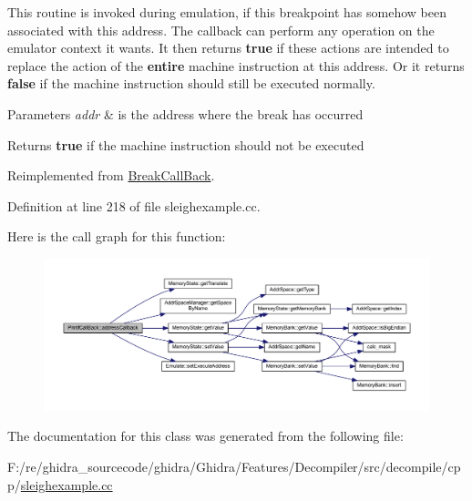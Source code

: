 This routine is invoked during emulation, if this breakpoint has somehow been associated with this address. The callback can perform any operation on the emulator context it wants. It then returns {\bfseries{true}} if these actions are intended to replace the action of the {\bfseries{entire}} machine instruction at this address. Or it returns {\bfseries{false}} if the machine instruction should still be executed normally. 
\begin{DoxyParams}{Parameters}
{\em addr} & is the address where the break has occurred \\
\hline
\end{DoxyParams}
\begin{DoxyReturn}{Returns}
{\bfseries{true}} if the machine instruction should not be executed 
\end{DoxyReturn}


Reimplemented from \mbox{\hyperlink{class_break_call_back_adb97ba6b111cb9a84856c9e0f9d506f9}{Break\+Call\+Back}}.



Definition at line 218 of file sleighexample.\+cc.

Here is the call graph for this function\+:
\nopagebreak
\begin{figure}[H]
\begin{center}
\leavevmode
\includegraphics[width=350pt]{class_printf_call_back_a9ff8d8997e91d769c03a4e09ad8373b5_cgraph}
\end{center}
\end{figure}


The documentation for this class was generated from the following file\+:\begin{DoxyCompactItemize}
\item 
F\+:/re/ghidra\+\_\+sourcecode/ghidra/\+Ghidra/\+Features/\+Decompiler/src/decompile/cpp/\mbox{\hyperlink{sleighexample_8cc}{sleighexample.\+cc}}\end{DoxyCompactItemize}
